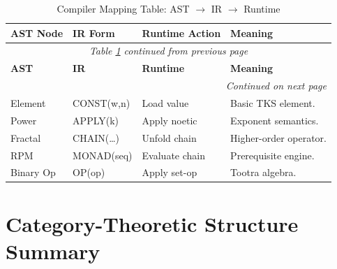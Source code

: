 \renewcommand{\arraystretch}{1.25}
\small
\begin{longtable}{p{1.8cm}|p{2.2cm}|p{2.5cm}|p{5cm}}
\caption{Compiler Mapping Table: AST $\to$ IR $\to$ Runtime}
\label{tab:compiler-mapping} \\
\toprule
\textbf{AST Node}
& \textbf{IR Form}
& \textbf{Runtime Action}
& \textbf{Meaning}
\\
\midrule
\endfirsthead
\multicolumn{4}{c}{\textit{Table \ref{tab:compiler-mapping} continued from previous page}} \\
\toprule
\textbf{AST}
& \textbf{IR}
& \textbf{Runtime}
& \textbf{Meaning}
\\
\midrule
\endhead
\midrule
\multicolumn{4}{r}{\textit{Continued on next page}} \\
\endfoot
\bottomrule
\endlastfoot

Element & CONST(w,n) & Load value & Basic TKS element. \\

Power & APPLY(k) & Apply noetic & Exponent semantics. \\

Fractal & CHAIN(\ldots) & Unfold chain & Higher-order operator. \\

RPM & MONAD(seq) & Evaluate chain & Prerequisite engine. \\

Binary Op & OP(op) & Apply set-op & Tootra algebra. \\

\end{longtable}
\normalsize

\section{Category-Theoretic Structure Summary}

